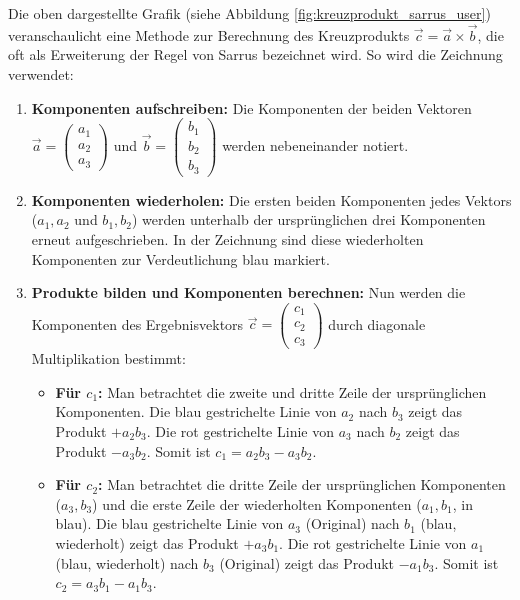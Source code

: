 Die oben dargestellte Grafik (siehe Abbildung
\ref{fig:kreuzprodukt_sarrus_user}) veranschaulicht eine Methode zur Berechnung
des Kreuzprodukts \(\vec{c} = \vec{a} \times \vec{b}\), die oft als Erweiterung
der Regel von Sarrus bezeichnet wird. So wird die Zeichnung verwendet:

\begin{enumerate}
    \item \textbf{Komponenten aufschreiben:} Die Komponenten der beiden Vektoren \(\vec{a} = \begin{pmatrix} a_1 \\ a_2 \\ a_3 \end{pmatrix}\) und \(\vec{b} = \begin{pmatrix} b_1 \\ b_2 \\ b_3 \end{pmatrix}\) werden nebeneinander notiert.
    \item \textbf{Komponenten wiederholen:} Die ersten beiden Komponenten jedes Vektors (\(a_1, a_2\) und \(b_1, b_2\)) werden unterhalb der ursprünglichen drei Komponenten erneut aufgeschrieben. In der Zeichnung sind diese wiederholten Komponenten zur Verdeutlichung blau markiert.
    \item \textbf{Produkte bilden und Komponenten berechnen:} Nun werden die Komponenten des Ergebnisvektors \(\vec{c} = \begin{pmatrix} c_1 \\ c_2 \\ c_3 \end{pmatrix}\) durch diagonale Multiplikation bestimmt:
          \begin{itemize}
              \item \textbf{Für \(c_1\):}
                    Man betrachtet die zweite und dritte Zeile der ursprünglichen Komponenten.
                    Die blau gestrichelte Linie von \(a_2\) nach \(b_3\) zeigt das Produkt \(+a_2 b_3\).
                    Die rot gestrichelte Linie von \(a_3\) nach \(b_2\) zeigt das Produkt \(-a_3 b_2\).
                    Somit ist \(c_1 = a_2 b_3 - a_3 b_2\).

              \item \textbf{Für \(c_2\):}
                    Man betrachtet die dritte Zeile der ursprünglichen Komponenten (\(a_3, b_3\)) und die erste Zeile der wiederholten Komponenten (\(a_1, b_1\), in blau).
                    Die blau gestrichelte Linie von \(a_3\) (Original) nach \(b_1\) (blau, wiederholt) zeigt das Produkt \(+a_3 b_1\).
                    Die rot gestrichelte Linie von \(a_1\) (blau, wiederholt) nach \(b_3\) (Original) zeigt das Produkt \(-a_1 b_3\).
                    Somit ist \(c_2 = a_3 b_1 - a_1 b_3\).


\end{itemize}
\end{enumerate}
